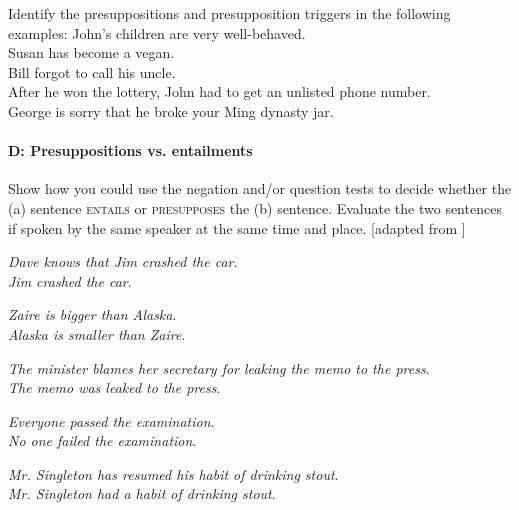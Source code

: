 {Identify the presuppositions and presupposition triggers in the following examples:
\ea
\ea
 John’s children are very well-behaved.\\
\ex Susan has become a vegan.\\
\ex Bill forgot to call his uncle.\\
\ex After he won the lottery, John had to get an unlisted phone number.\\
\ex George is sorry that he broke your Ming dynasty jar.
\z
\z

\paragraph*{D: Presuppositions vs. entailments}

Show how you could use the negation and/or question tests to decide whether the (a) sentence \textsc{entails} or \textsc{presupposes} the (b) sentence. Evaluate the two sentences if spoken by the same speaker at the same time and place. [adapted from \citet[114, ex. 4.8]{Saeed2009}]
 
\ea%
\ea \textit{Dave knows that Jim crashed the car}.\\
\ex \textit{Jim crashed the car}.\\

\z 
\z

\ea%
\ea  \textit{Zaire is bigger than Alaska}.\\
\ex \textit{Alaska is smaller than Zaire}.
\z \z

\ea%

    \ea\textit{The minister blames her secretary for leaking the memo to the press}.\\
\ex \textit{The memo was leaked to the press}.
\z \z

\ea%
\ea \textit{Everyone passed the examination}.\\
\ex \textit{No one failed the examination}.
\z 
\z

\ea%
\ea \textit{Mr. Singleton has resumed his habit of drinking stout}.\\
\ex \textit{Mr. Singleton had a habit of drinking stout}.
    \z 
    \z
}


